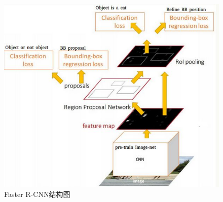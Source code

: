 \begin{figure}[h]
  \centering
  \includegraphics[width=0.7\linewidth]{Img/faster-rcnn.jpg}
  \caption{Faster R-CNN结构图}
  \label{fig:faster-rcnn}
\end{figure}

